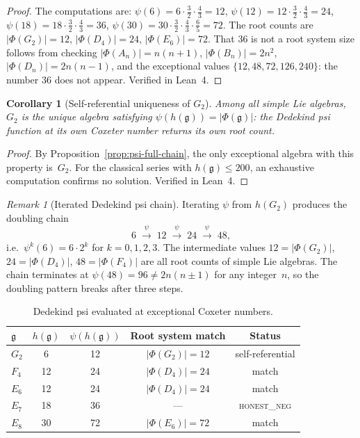 \documentclass[11pt]{amsart}
\theoremstyle{plain}
\newtheorem{corollary}[theorem]{Corollary}
\theoremstyle{definition}
\theoremstyle{remark}
\newtheorem{remark}[theorem]{Remark}
\newcommand{\fg}{\mathfrak{g}}
\renewcommand{\Phi}{\varPhi}
\begin{document}
\begin{proof}
The computations are:
$\psi(6) = 6 \cdot \tfrac{3}{2} \cdot \tfrac{4}{3} = 12$,
$\psi(12) = 12 \cdot \tfrac{3}{2} \cdot \tfrac{4}{3} = 24$,
$\psi(18) = 18 \cdot \tfrac{3}{2} \cdot \tfrac{4}{3} = 36$,
$\psi(30) = 30 \cdot \tfrac{3}{2} \cdot \tfrac{4}{3} \cdot \tfrac{6}{5} = 72$.
The root counts are $|\Phi(G_2)| = 12$, $|\Phi(D_4)| = 24$,
$|\Phi(E_6)| = 72$.
That $36$ is not a root system size follows from checking
$|\Phi(A_n)| = n(n+1)$, $|\Phi(B_n)| = 2n^2$,
$|\Phi(D_n)| = 2n(n-1)$, and the exceptional values
$\{12, 48, 72, 126, 240\}$: the number $36$ does not appear.
Verified in Lean~4.
\end{proof}

\begin{corollary}[Self-referential uniqueness of $G_2$]%
\label{cor:g2-self-ref}
Among all simple Lie algebras, $G_2$ is the unique algebra satisfying
$\psi(h(\fg)) = |\Phi(\fg)|$: the Dedekind psi function at its own
Coxeter number returns its own root count.
\end{corollary}

\begin{proof}
By Proposition~\ref{prop:psi-full-chain}, the only exceptional algebra
with this property is~$G_2$.  For the classical series with
$h(\fg) \le 200$, an exhaustive computation confirms no solution.
Verified in Lean~4.
\end{proof}

\begin{remark}[Iterated Dedekind psi chain]\label{rem:psi-iter}
Iterating $\psi$ from $h(G_2)$ produces the doubling chain
\[
  6 \;\xrightarrow{\psi}\; 12 \;\xrightarrow{\psi}\; 24
  \;\xrightarrow{\psi}\; 48,
\]
i.e.\ $\psi^k(6) = 6 \cdot 2^k$ for $k = 0,1,2,3$.  The intermediate
values $12 = |\Phi(G_2)|$, $24 = |\Phi(D_4)|$, $48 = |\Phi(F_4)|$ are
all root counts of simple Lie algebras.  The chain terminates at
$\psi(48) = 96 \ne 2n(n\pm 1)$ for any integer~$n$, so the doubling
pattern breaks after three steps.
\end{remark}

\begin{table}[ht]
\centering
\caption{Dedekind psi evaluated at exceptional Coxeter numbers.}%
\label{tab:psi-coxeter}
\begin{tabular}{@{}lcccc@{}}
\toprule
$\fg$ & $h(\fg)$ & $\psi(h(\fg))$ & Root system match & Status \\
\midrule
$G_2$ &  6 & 12 & $|\Phi(G_2)| = 12$ & self-referential \\
$F_4$ & 12 & 24 & $|\Phi(D_4)| = 24$ & match \\
$E_6$ & 12 & 24 & $|\Phi(D_4)| = 24$ & match \\
$E_7$ & 18 & 36 & --- & \textsc{honest\_neg} \\
$E_8$ & 30 & 72 & $|\Phi(E_6)| = 72$ & match \\
\bottomrule
\end{tabular}
\end{table}
\end{document}
